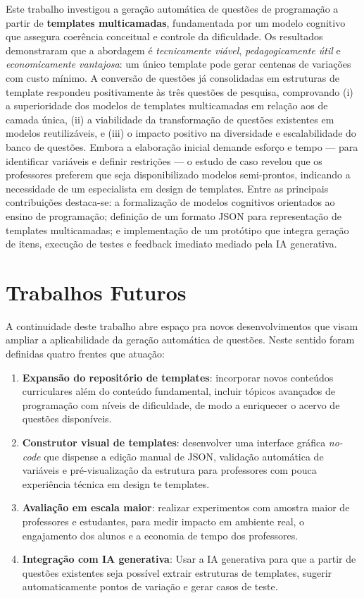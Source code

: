 Este trabalho investigou a geração automática de questões de programação a partir de \textbf{templates multicamadas}, fundamentada por um modelo cognitivo que assegura coerência conceitual e controle da dificuldade. Os resultados demonstraram que a abordagem é \textit{tecnicamente viável}, \textit{pedagogicamente útil} e \textit{economicamente vantajosa}: um único template pode gerar centenas de variações com custo mínimo. A conversão de questões já consolidadas em estruturas de template respondeu positivamente às três questões de pesquisa, comprovando (i) a superioridade dos modelos de templates multicamadas em relação aos de camada única, (ii) a viabilidade da transformação de questões existentes em modelos reutilizáveis, e (iii) o impacto positivo na diversidade e escalabilidade do banco de questões. Embora a elaboração inicial demande esforço e tempo — para identificar variáveis e definir restrições — o estudo de caso revelou que os professores preferem que seja disponibilizado modelos semi-prontos, indicando a necessidade de um especialista em design de templates. Entre as principais contribuições destaca-se: a formalização de modelos cognitivos orientados ao ensino de programação; definição de um formato JSON para representação de templates multicamadas; e implementação de um protótipo que integra geração de itens, execução de testes e feedback imediato mediado pela IA generativa. 

\section*{Trabalhos Futuros}

A continuidade deste trabalho abre espaço pra novos desenvolvimentos que visam ampliar a aplicabilidade da geração automática de questões. Neste sentido foram definidas quatro frentes que atuação:

\begin{enumerate}[label=\alph*)]
  \item \textbf{Expansão do repositório de templates}: incorporar novos conteúdos curriculares além do conteúdo fundamental, incluir tópicos avançados de programação com níveis de dificuldade, de modo a enriquecer o acervo de questões disponíveis.
  \item \textbf{Construtor visual de templates}: desenvolver uma interface gráfica \emph{no-code} que dispense a edição manual de JSON, validação automática de variáveis e pré-visualização da estrutura para professores com pouca experiência técnica em design te templates.
  \item \textbf{Avaliação em escala maior}: realizar experimentos com amostra maior de professores e estudantes, para medir impacto em ambiente real, o engajamento dos alunos e a economia de tempo dos professores.
  \item \textbf{Integração com IA generativa}: Usar a IA generativa para que a partir de questões existentes seja possível extrair estruturas de templates, sugerir automaticamente pontos de variação e gerar casos de teste.
\end{enumerate}


